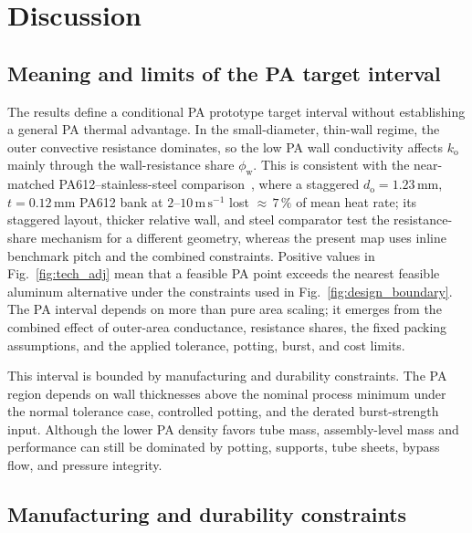\section{Discussion}
\label{sec:discussion}

\subsection{Meaning and limits of the PA target interval}

The results define a conditional PA prototype target interval without
establishing a general PA thermal advantage. In the small-diameter, thin-wall
regime, the outer convective resistance dominates, so the low PA wall conductivity affects
$k_{\mathrm{o}}$ mainly through the wall-resistance share
$\phi_{\mathrm{w}}$. This is consistent with the near-matched
PA612--stainless-steel comparison~\cite{Astrouski2026}, where a staggered
$d_{\mathrm{o}}=1.23\,\mathrm{mm}$, $t=0.12\,\mathrm{mm}$ PA612 bank at
$2$--$10\,\mathrm{m\,s^{-1}}$ lost ${\approx}\,7\,\%$ of mean heat rate; its
staggered layout, thicker relative wall, and steel comparator test the
resistance-share mechanism for a different geometry, whereas the present map
uses inline benchmark pitch and the combined constraints.
Positive values in Fig.~\ref{fig:tech_adj} mean that a feasible PA
point exceeds the nearest feasible aluminum alternative under the constraints
used in Fig.~\ref{fig:design_boundary}.
The PA interval depends on more than pure area scaling; it emerges from the
combined effect of outer-area conductance, resistance shares, the fixed
packing assumptions, and the applied tolerance, potting, burst, and cost
limits.

This interval is bounded by manufacturing and durability constraints. The PA
region depends on wall thicknesses above the nominal process minimum under the
normal tolerance case, controlled potting, and the derated burst-strength
input.
Although the lower PA density favors tube mass, assembly-level mass and
performance can still be dominated by potting, supports, tube sheets, bypass
flow, and pressure integrity.

\subsection{Manufacturing and durability constraints}

